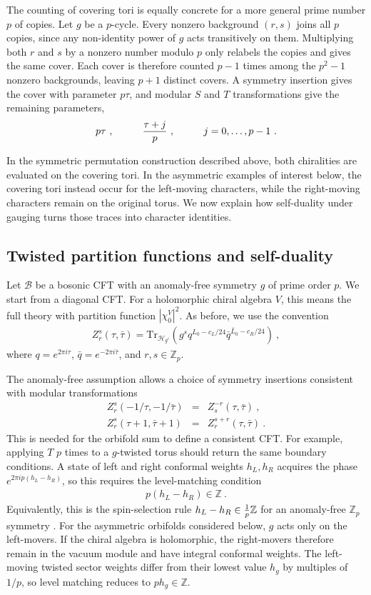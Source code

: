 \documentclass[12pt]{article}
\numberwithin{equation}{section}
\newcommand{\bea}{\begin{eqnarray}}
\newcommand{\eea}{\end{eqnarray}}
\def\no{\nonumber}
\def\ZZ{\mathbb{Z}}
\def\cB{\mathcal{B}}
\def\cH{\mathcal{H}}
\newcommand{\Tr}{\mathrm{Tr}}
\theoremstyle{remark}
\begin{document}
The counting of covering tori is equally concrete for a more general prime number $p$ of copies. Let $g$ be a $p$-cycle. Every nonzero background $(r,s)$ joins all $p$ copies, since any non-identity power of $g$ acts transitively on them. Multiplying both $r$ and $s$ by a nonzero number modulo $p$ only relabels the copies and gives the same cover. Each cover is therefore counted $p-1$ times among the $p^2-1$ nonzero backgrounds, leaving $p+1$ distinct covers. A symmetry insertion gives the cover with parameter $p\tau$, and modular $S$ and $T$ transformations give the remaining parameters,
\bea \label{eq:CoverParameters}
p\tau~,
\hspace{0.4 in}
{\tau+j\over p}~,
\hspace{0.4 in}
j=0,\ldots,p-1~.
\eea

In the symmetric permutation construction described above, both chiralities are evaluated on the covering tori.
In the asymmetric examples of interest below, the covering tori instead occur for the left-moving characters, while the right-moving characters remain on the original torus. We now explain how self-duality under gauging turns those traces into character identities.

\subsection{Twisted partition functions and self-duality}
\label{sec:TwistedPartitionFunctions}

Let $\cB$ be a bosonic CFT with an anomaly-free symmetry $g$ of prime order $p$. We start from a diagonal CFT. For a holomorphic chiral algebra $V$, this means the full theory with partition function $|\chi^V_0|^2$. As before, we use the convention
\bea
Z^s_r(\tau,\bar\tau)=\Tr_{\cH_{g^r}}\!\left(g^s q^{L_0-c_L/24}\bar q^{\bar L_0-c_R/24}\right)~,
\eea
where $q=e^{2\pi i\tau}$, $\bar q=e^{-2\pi i\bar\tau}$, and $r,s\in\ZZ_p$. 

The anomaly-free assumption allows a choice of symmetry insertions consistent with modular transformations 
\bea \label{eq:defectmodular}
Z^s_r(-1/\tau,-1/\bar\tau)&=&Z^{-r}_s(\tau,\bar\tau)~,
\no\\
Z^s_r(\tau+1,\bar\tau+1)&=&Z^{s+r}_r(\tau,\bar\tau)~.
\eea
This is needed for the orbifold sum to define a consistent CFT. For example, applying $T$ $p$ times to a $g$-twisted torus should return the same boundary conditions. A state of left and right conformal weights $h_L,h_R$ acquires the phase $e^{2\pi ip(h_L-h_R)}$, so this requires the level-matching condition  \cite{Vafa:1986wx,Freed:1987qk,Dong:1997ea}
\bea
p(h_L-h_R)\in\ZZ~.
\eea
 Equivalently, this is the spin-selection rule $h_L-h_R\in{1\over p}\ZZ$ for an anomaly-free $\ZZ_p$ symmetry \cite{Chang:2018iay,Lin:2021udi}. For the asymmetric orbifolds considered below, $g$ acts only on the left-movers. If the chiral algebra is holomorphic, the right-movers therefore remain in the vacuum module and have integral conformal weights. The left-moving twisted sector weights differ from their lowest value $h_g$ by multiples of $1/p$, so level matching reduces to $ph_g\in\ZZ$.
 
\end{document}
